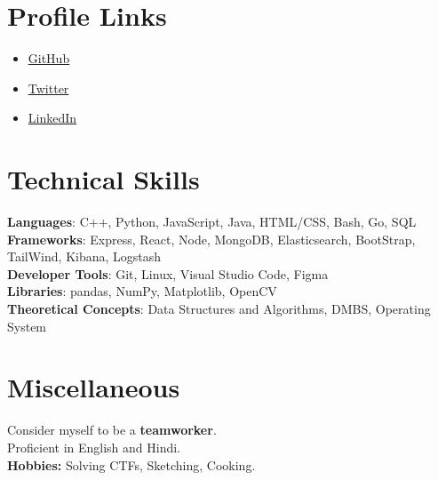 \documentclass[a4paper,20pt]{article}
\newcommand{\resumeItem}[1]{
  \item\small{
    {#1 \vspace{-2pt}}
  }
}
\newcommand{\resumeItemListStart}{\begin{itemize}}
\newcommand{\resumeItemListEnd}{\end{itemize}\vspace{-5pt}}
\begin{document}
\section{Profile Links}
 \begin{itemize}[leftmargin=0.15in, label={}]
    \resumeItemListStart
        \resumeItem {\href{https://github.com/godofgeeks23}{GitHub}}
        \resumeItem {\href{https://twitter.com/godofgeeks_}{Twitter}}
        \resumeItem {\href{https://www.linkedin.com/in/aviral-srivastava-07b1a4202/}{LinkedIn}}
      \resumeItemListEnd
 \end{itemize}
 \vspace{-16pt}

%
\section{Technical Skills}
 \begin{itemize}[leftmargin=0.15in, label={}]
    \small{\item{
     \textbf{Languages}{: C++, Python, JavaScript, Java, HTML/CSS, Bash, Go, SQL} \\
     \textbf{Frameworks}{: Express, React, Node, MongoDB, Elasticsearch, BootStrap, TailWind, Kibana, Logstash } \\
     \textbf{Developer Tools}{: Git, Linux, Visual Studio Code, Figma} \\
     \textbf{Libraries}{: pandas, NumPy, Matplotlib, OpenCV} \\
     \textbf{Theoretical Concepts}{: Data Structures and Algorithms, DMBS, Operating System} \\
    }}
 \end{itemize}
 \vspace{-16pt}

%
\section{Miscellaneous}
 \begin{itemize}[leftmargin=0.15in, label={}]
    \small{\item{
     {Consider myself to be a \textbf{teamworker}.} \\
     {Proficient in English and Hindi.} \\
     {\textbf{Hobbies:} Solving CTFs, Sketching, Cooking.} \\
    }}
 \end{itemize}
 \vspace{-16pt}
\end{document}
